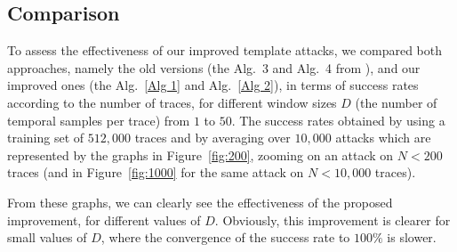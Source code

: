 \documentclass[conference,twocolumn]{IEEEtran}
\begin{document}





  
 \subsection{Comparison}
  
To assess the effectiveness of our improved template attacks, we compared both approaches, namely the old versions (the Alg.~3 and Alg.~4 from \cite{OULADJ2019}), and our improved ones (the Alg.~\ref{Alg 1} and Alg.~\ref{Alg 2}), in terms of success rates according to the number of traces, for different window sizes $D$ (the number of temporal samples per trace) from $1$ to $50$. 
The success rates obtained by using a training set of $512,000$ traces and by averaging over $10,000$ attacks which are represented by the graphs in Figure~\ref{fig:200}, zooming on an attack on $N<200$ traces (and in Figure~\ref{fig:1000} for the same attack on $N<10,000$ traces).


From these graphs, we can clearly see the effectiveness of the proposed improvement, for different values of $D$. Obviously, this improvement is clearer for small values of $D$, where the convergence of the success rate to $100\%$ is slower.
\end{document}

